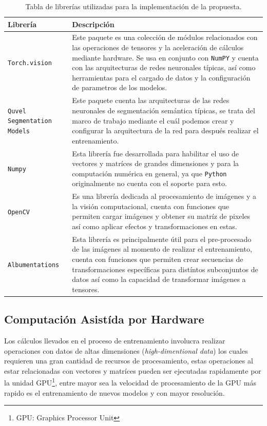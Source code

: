 \begin{table}[H]
    \centering
    \caption{Tabla de librerías utilizadas para la implementación de la propuesta.}
    \begin{tabular}{|p{3cm}|p{10cm}|}
        \hline
        Librería & Descripción \\
        \hline
        \texttt{Torch.vision} & Este paquete es una colección de módulos relacionados con las operaciones de tensores y la aceleración de cálculos mediante hardware. Se usa en conjunto con \texttt{NumPY} y cuenta con las arquitecturas de redes neuronales típicas, así como herramientas para el cargado de datos y la configuración de parametros de los modelos.\\
        
        \hline
        \texttt{Quvel Segmentation Models} & Este paquete cuenta las arquitecturas de las redes neuronales de segmentación semántica típicas, se trata del marco de trabajo mediante el cuál podemos crear y configurar la arquitectura de la red para después realizar el entrenamiento.\\
        
        \hline
        \texttt{Numpy} & Esta librería fue desarrollada para habilitar el uso de vectores y matríces de grandes dimensiones y para la computación numérica en general, ya que \texttt{Python} originalmente no cuenta con el soporte para esto.\\
        
        \hline
        \texttt{OpenCV} & Es una librería dedicada al procesamiento de imágenes y a la visión computacional, cuenta con funciones que permiten cargar imágenes y obtener su matríz de pixeles así como aplicar efectos y transformaciones en estas.\\

        \hline
        \texttt{Albumentations} & Esta librería es principalmente útil para el pre-procesado de las imágenes al momento de realizar el entrenamiento, cuenta con funciones que permiten crear secuencias de transformaciones específicas para distíntos subconjuntos de datos así como la capacidad de transformar imágenes a tensores.\\

        \hline
    \end{tabular}
    \label{tab:libs}
\end{table}

\subsection{Computación Asistída por Hardware}
Los cálculos llevados en el proceso de entrenamiento involucra realizar operaciones con datos de altas dimensiones (\emph{high-dimentional data}) los cuales requieren una gran cantidad de recursos de procesamiento, estas operaciones al estar relacionadas con vectores y matríces pueden ser ejecutadas rapidamente por la unidad GPU\footnote{GPU: Graphics Processor Unit}, entre mayor sea la velocidad de procesamiento de la GPU más rapido es el entrenamiento de nuevos modelos y con mayor resolución.

